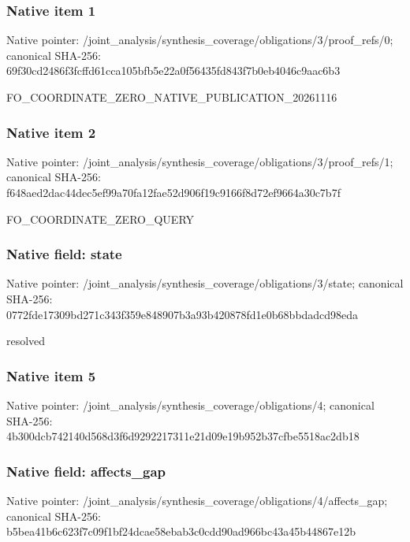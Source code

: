 \documentclass[10pt,a4paper]{article}
\begin{document}
\subsubsection{Native item 1}
Native pointer: /joint\_\allowbreak{}analysis/synthesis\_\allowbreak{}coverage/obligations/3/proof\_\allowbreak{}refs/0; canonical SHA-256: 69f30cd2486f3fcffd61cca105bfb5e22a0f56435fd843f7b0eb4046c9aac6b3

\begingroup\raggedright\sloppy FO\_\allowbreak{}COORDINATE\_\allowbreak{}ZERO\_\allowbreak{}NATIVE\_\allowbreak{}PUBLICATION\_\allowbreak{}20261116\par\endgroup

\subsubsection{Native item 2}
Native pointer: /joint\_\allowbreak{}analysis/synthesis\_\allowbreak{}coverage/obligations/3/proof\_\allowbreak{}refs/1; canonical SHA-256: f648aed2dac44dec5ef99a70fa12fae52d906f19c9166f8d72ef9664a30c7b7f

\begingroup\raggedright\sloppy FO\_\allowbreak{}COORDINATE\_\allowbreak{}ZERO\_\allowbreak{}QUERY\par\endgroup

\subsubsection{Native field: state}
Native pointer: /joint\_\allowbreak{}analysis/synthesis\_\allowbreak{}coverage/obligations/3/state; canonical SHA-256: 0772fde17309bd271c343f359e848907b3a93b420878fd1e0b68bbdadcd98eda

\begingroup\raggedright\sloppy resolved\par\endgroup

\subsubsection{Native item 5}
Native pointer: /joint\_\allowbreak{}analysis/synthesis\_\allowbreak{}coverage/obligations/4; canonical SHA-256: 4b300dcb742140d568d3f6d9292217311e21d09e19b952b37cfbe5518ac2db18

\subsubsection{Native field: affects\_\allowbreak{}gap}
Native pointer: /joint\_\allowbreak{}analysis/synthesis\_\allowbreak{}coverage/obligations/4/affects\_\allowbreak{}gap; canonical SHA-256: b5bea41b6c623f7c09f1bf24dcae58ebab3c0cdd90ad966bc43a45b44867e12b
\end{document}
